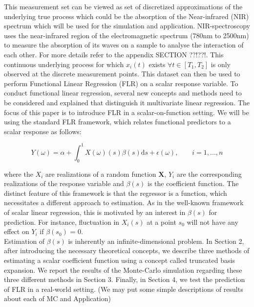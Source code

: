 \documentclass[11pt,twoside,a4paper]{article}
\begin{document}
		
			 This measurement set can be viewed as set of discretized approximations of the underlying true process which could be the absorption of the Near-infrared (NIR) spectrum which will be used for the simulation and application. NIR-spectroscopy uses the near-infrared region of the electromagnetic spectrum (780nm to 2500nm) to measure the absorption of its waves on a sample to analyse the interaction of each other. {\color{green} For more details refer to the appendix SECTION ??!??!}. This continuous underlying process for which 
 $x_i(t)$ exists $\forall t \in [T_1, T_2]$ is only observed at the discrete measurement points. This dataset can then be used to perform Functional Linear Regression (FLR) on a scalar response variable. To conduct functional linear regression, several new concepts and methods need to be considered and explained that distinguish it multivariate linear regression.
The focus of this paper is to introduce FLR in a scalar-on-function setting. We will be using the standard FLR framework, which relates functional predictors to a scalar response as follows:
	 
	 \begin{equation}
	 	Y(\omega) = \alpha + \int_{0}^{1}{X(\omega)(s)\beta(s) \mathrm{d}s} + \epsilon(\omega),
	 	\qquad i = 1, ..., n
	 \end{equation}
 
	 where the $X_{i}$ are realizations of a random function $\mathbf{X}$, $Y_i$ are the corresponding realizations of the response variable and $\beta(s)$ is the coefficient function. The distinct feature of this framework is that the regressor is a function, which necessitates a different approach to estimation. As in the well-known framework of scalar linear regression, this is motivated by an interest in $\beta(s)$ for prediction. For instance, fluctuation in $X_i(s)$ at a point $s_0$ will not have any effect on $Y_i$ if $\beta(s_0)$ = 0. \\
	 Estimation of $\beta(s)$ is inherently an infinite-dimensional problem. In Section 2, after introducing the necessary theoretical concepts, we describe three methods of estimating a scalar coefficient function using a concept called truncated basis expansion. We report the results of the Monte-Carlo simulation regarding these three different methods in Section 3. Finally, in Section 4, we test the prediction of FLR in a real-world setting. {\color{red} (We may put some simple descriptions of results about each of MC and Application)}
\end{document}

